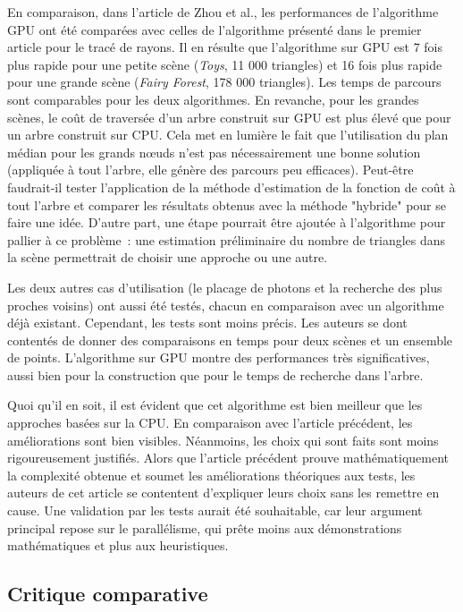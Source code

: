 \documentclass[a4paper]{article}
\begin{document}
En comparaison, dans l'article de Zhou et al., les performances de l'algorithme GPU ont été comparées avec celles de l'algorithme présenté dans le premier article pour le tracé de rayons. Il en résulte que l'algorithme sur GPU est 7 fois plus rapide pour une petite scène (\textit{Toys}, 11 000 triangles) et 16 fois plus rapide pour une grande scène (\textit{Fairy Forest}, 178 000 triangles). Les temps de parcours sont comparables pour les deux algorithmes. En revanche, pour les grandes scènes, le coût de traversée d'un arbre construit sur GPU est plus élevé que pour un arbre construit sur CPU. Cela met en lumière le fait que l'utilisation du plan médian pour les grands nœuds n'est pas nécessairement une bonne solution (appliquée à tout l'arbre, elle génère des parcours peu efficaces). Peut-être faudrait-il tester l'application de la méthode d'estimation de la fonction de coût à tout l'arbre et comparer les résultats obtenus avec la méthode "hybride" pour se faire une idée. D'autre part, une étape pourrait être ajoutée à l'algorithme pour pallier à ce problème~: une estimation préliminaire du nombre de triangles dans la scène permettrait de choisir une approche ou une autre.

Les deux autres cas d'utilisation (le placage de photons et la recherche des plus proches voisins) ont aussi été testés, chacun en comparaison avec un algorithme déjà existant. Cependant, les tests sont moins précis. Les auteurs se dont contentés de donner des comparaisons en temps pour deux scènes et un ensemble de points. L'algorithme sur GPU montre des performances très significatives, aussi bien pour la construction que pour le temps de recherche dans l'arbre.

Quoi qu'il en soit, il est évident que cet algorithme est bien meilleur que les approches basées sur la CPU. En comparaison avec l'article précédent, les améliorations sont bien visibles. Néanmoins, les choix qui sont faits sont moins rigoureusement justifiés. Alors que l'article précédent prouve mathématiquement la complexité obtenue et soumet les améliorations théoriques aux tests, les auteurs de cet article se contentent d'expliquer leurs choix sans les remettre en cause. Une validation par les tests aurait été souhaitable, car leur argument principal repose sur le parallélisme, qui prête moins aux démonstrations mathématiques et plus aux heuristiques.

\subsection{Critique comparative}
\end{document}
